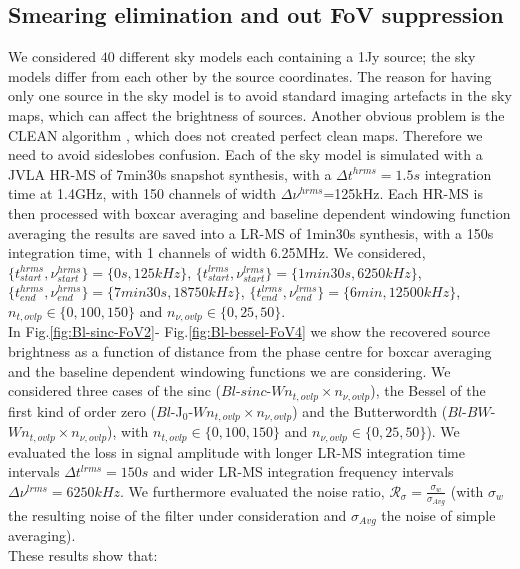 \documentclass[useAMS,usenatbib]{mn2e}
\begin{document}
\subsection{Smearing elimination and out FoV suppression}
We considered $40$ different sky models each  containing a 1Jy source; the sky models differ from each other by the source coordinates. 
The reason for having  only one source in the sky model is to avoid standard imaging artefacts in the sky maps, which 
can affect the brightness of sources. Another obvious problem is the  CLEAN algorithm \citep{cornwell1999deconvolution}, which does not 
created 
perfect clean maps. Therefore we need to avoid sideslobes confusion. Each of the sky model is simulated 
with a JVLA HR-MS of 7min30s snapshot synthesis, with a $\Delta t^{hrms}=1.5s$ integration 
time at 1.4GHz,  with 150 channels of width $\Delta \nu^{hrms}$=125kHz.  Each HR-MS is then processed with boxcar averaging and baseline 
dependent windowing function averaging the results are saved into a LR-MS of 1min30s synthesis, with a 150s integration time,  with 1 
channels of width 6.25MHz. We 
considered, $\{t^{hrms}_{start},\nu^{hrms}_{start}\}=\{0s,125kHz\}$, $\{t^{lrms}_{start},\nu^{lrms}_{start}\}=\{1min30s,6250kHz\}$, 
$\{t^{hrms}_{end},\nu^{hrms}_{end}\}=\{7min30s,18750kHz\}$, $\{t^{lrms}_{end},\nu^{lrms}_{end}\}=\{6min,12500kHz\}$, 
$n_{t,ovlp}\in\{0,100,150\}$ 
and $n_{\nu,ovlp}\in\{0,25,50\}$.\\
In Fig.\ref{fig:Bl-sinc-FoV2}- Fig.\ref{fig:Bl-bessel-FoV4} we
show the recovered source brightness as a function of  distance from the phase centre for boxcar averaging and the baseline dependent 
windowing functions we are considering. We considered three cases of the sinc ($Bl$-$sinc$-$W n_{t,ovlp} \times n_{\nu,ovlp}$), the Bessel 
of the first kind of order zero ($Bl$-J$_0$-$W n_{t,ovlp} \times n_{\nu,ovlp}$) and the Butterwordth ($Bl$-$BW$-$W n_{t,ovlp} \times 
n_{\nu,ovlp}$),  with  $n_{t,ovlp}\in\{0,100,150\}$ and $n_{\nu,ovlp}\in\{0,25,50\}$). We evaluated the loss in signal 
amplitude with longer LR-MS integration time intervals $\Delta t^{lrms}=150s$ and wider LR-MS integration frequency intervals $\Delta 
\nu^{lrms}=6250kHz$. We furthermore evaluated the  noise ratio, $\mathcal{R}_{\sigma}=\frac{\sigma_{w}}{\sigma_{Avg}}$ (with $\sigma_{w}$  
the resulting noise of the filter under consideration and $\sigma_{Avg}$ the noise of simple averaging).\\
These results show that:
\end{document}
